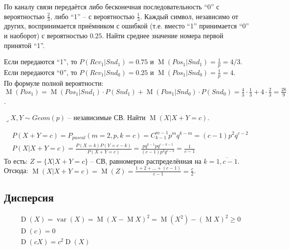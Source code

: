 \documentclass[a4paper,12pt,fleqn]{article}
\newenvironment{onsamepage} {\begin{minipage}{\textwidth}} {\end{minipage}}
\numberwithin{figure}{section}
\theoremstyle{definition}
\let\geqs\geqslant
\DeclareMathOperator{\var}{var}
\DeclareMathOperator{\M}{M}
\DeclareMathOperator{\D}{D}
\def\lets{{\huge$\lrcorner$}\space}
\begin{document}
\bigskip
\begin{onsamepage}
\begin{problem}
	По каналу связи передаётся либо бесконечная последовательность ``0'' с вероятностью $\tfrac23$,
	либо ``1'' -- с вероятностью $\tfrac13$. Каждый символ, независимо от других,
	воспринимается приёмником с ошибкой (т.е. вместо ``1'' принимается ``0'' и наоборот)
	с вероятностью $0.25$. Найти среднее значение номера первой принятой ``1''.
\end{problem}
\begin{solution}
	Если передаются ``1'', то $P(Rcv_1|Snd_1)=0.75$ и $\M(Pos_1|Snd_1)=\tfrac1p=4/3$. \\
	Если передаются ``0'', то $P(Rcv_1|Snd_0)=0.25$ и $\M(Pos_1|Snd_0)=\tfrac1p=4$. \\
	По формуле полной вероятности: \\
	$ \M(Pos_1) = \M(Pos_1|Snd_1) \cdot P(Snd_1) + \M(Pos_1|Snd_0) \cdot P(Snd_0)
				= \tfrac43 \!\cdot\! \tfrac13 + 4 \!\cdot\! \tfrac23 = \tfrac{28}{9} $.
\end{solution}
\end{onsamepage}

\bigskip
\begin{onsamepage}
\begin{problem}
	\lets $X,Y \sim Geom(p)$ -- независимые СВ. Найти $\M(X|X+Y=c)$.
\end{problem}
\begin{solution}
	\begin{align*}
	&	P(X+Y=c) = P_{pascal}(m=2,p,k=c) = C_{k-1}^{m-1} p^m q^{k-m} = (c-1)p^2q^{c-2} \\
	&	P(X|X+Y=c)  = \frac{P(X=k)P(Y=c-k)}{P(X+Y=c)}
					= \frac{pq^{k-1} pq^{c-k-1}}{(c-1)p^2q^{c-2}} = \frac{1}{c-1}
	\end{align*}
	То есть: $Z=\{X|X+Y=c\}$ -- СВ, равномерно распределённая на $k=\overline{1,c-1}$.
	Отсюда: $\M(X|X+Y=c) = \M(Z) = \frac{1+2+...+(c-1)}{c-1} = \frac{c}{2}$.
\end{solution}
\end{onsamepage}



\subsection{Дисперсия}

\begin{align*}
&	\D(X) = \var(X) = \M(X-\M X)^2 = \M(X^2) - (\M X)^2 \geqs 0 \\
&	\D(c) = 0 \\
&	\D(cX) = c^2\D(X)
\end{align*}
\end{document}
